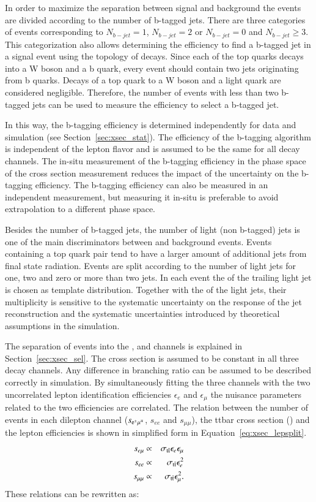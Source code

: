 In order to maximize the separation between signal and background the events are divided according to the number of b-tagged jets.
There are three categories of events corresponding to $N_{b-jet}=1$, $N_{b-jet}=2$ or $N_{b-jet}=0$ and $N_{b-jet} \geq 3$.
This categorization also allows determining the efficiency to find a b-tagged jet in a signal event using the topology of \ttbar decays.
Since each of the top quarks decays into a W boson and a b quark, every \ttbar event should contain two jets originating from b quarks.
Decays of a top quark to a W boson and a light quark are considered negligible.
Therefore, the number of \ttbar events with less than two b-tagged jets can be used to measure the efficiency to select a b-tagged jet.

In this way, the b-tagging efficiency is determined independently for data and simulation (see Section~\ref{sec:xsec_stat}). The efficiency of the b-tagging algorithm is independent of the lepton flavor and is  assumed to be the same for all \ttbar decay channels.
The in-situ measurement of the b-tagging efficiency in the phase space of the \ttbar cross section measurement reduces the impact of the uncertainty on the b-tagging efficiency.
The b-tagging efficiency can also be measured in an independent measurement, but measuring it in-situ is preferable to avoid extrapolation to a different phase space.

Besides the number of b-tagged jets, the number of light (non b-tagged) jets is one of the main discriminators between \ttbar and background events.
Events containing a top quark pair tend to have a larger amount of additional jets from final state radiation.
Events are split according to the number of light jets for one, two and zero or more than two jets.
In each event the \pt of the trailing light jet is chosen as template distribution.
Together with the \pt of the light jets, their multiplicity is sensitive to the systematic uncertainty on the response of the jet reconstruction and
the systematic uncertainties introduced by theoretical assumptions in the simulation.

The separation of events into the \emu, \mumu and \ee channels is explained in Section~\ref{sec:xsec_sel}. The \ttbar cross section is assumed to be constant in all three decay channels. Any difference in branching 
ratio can be assumed to be described correctly in simulation.
By simultaneously fitting the three channels with the two uncorrelated lepton identification efficiencies $\epsilon_e$ and $\epsilon_\mu$ the nuisance parameters related to the two efficiencies are correlated. 
The relation between the number of \ttbar events in each dilepton channel ($s_{\mathrm{e}^\pm\mu^\mp}$, $s_{ee}$ and $s_{\mu\mu}$), the ttbar cross section (\stt) and the lepton 
efficiencies  is shown in simplified form in Equation~\ref{eq:xsec_lepsplit}.
\begin{eqnarray}
s_{e \mu}  &\propto& \sigma_\mathrm{t\bar{t}} \epsilon_{e} \epsilon_{\mu}  \\
s_{ee}  &\propto&  \sigma_\mathrm{t\bar{t}} \epsilon_{e}^2  \\
s_{\mu \mu}  &\propto&  \sigma_\mathrm{t\bar{t}} \epsilon_{\mu}^2
\label{eq:xsec_lepsplit}.
\end{eqnarray}
These relations can be rewritten as: 

